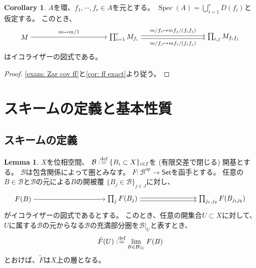 \documentclass[uplatex]{jsarticle}
\theoremstyle{definition}
\newtheorem{cor}[cor]{Corollary}
\newtheorem{lem}[lem]{Lemma}
\DeclareMathOperator{\Spec}{\mathrm{Spec}}
\newcommand{\op}{\mathrm{op}}
\newcommand{\dfn}{:\overset{\mbox{{\scriptsize def}}}{=}}
\newcommand{\mcB}{\mathcal{B}}
\begin{document}
\begin{cor}\label{cor: Zar cov exact}
  \(A\)を環、\(f_1,\cdots, f_r\in A\)を元とする。
  \(\Spec(A) = \bigcup_{i=1}^rD(f_i)\)と仮定する。
  このとき、
  \[
  \begin{tikzpicture}[auto]
    \node (a) at (0, 0) {\(M\)};
    \node (b) at (5, 0) {\(\prod_{i=1}^r M_{f_i}\)};
    \node (c) at (10, 0) {\(\prod_{i,j} M_{f_if_j}\)};
    \draw[->] (a) to node {\(\scriptstyle m\mapsto m/1\)} (b);
    \draw[->, transform canvas={yshift=2pt}]
    (b) to node {\(\scriptstyle m/f_i\mapsto mf_j/(f_if_j)\)} (c);
    \draw[->, transform canvas={yshift=-2pt}]
    (b) to node[swap] {\(\scriptstyle m/f_j\mapsto mf_i/(f_if_j)\)} (c);
  \end{tikzpicture}
  \]
  はイコライザーの図式である。
\end{cor}

\begin{proof}
  \autoref{exam: Zar cov ff}と\autoref{cor: ff exact}より従う。
\end{proof}




\section{スキームの定義と基本性質}



\subsection{スキームの定義}


\begin{lem}\label{lem: B-sh}
  \(X\)を位相空間、
  \(\mcB \dfn \{B_i\subset X\}_{i\in I}\)を (有限交差で閉じる) 開基とする。
  \(\mcB\)は包含関係によって圏とみなす。
  \(F:\mcB^{\op} \to \mathsf{Set}\)を函手とする。
  任意の\(B\in \mcB\)と\(\mcB\)の元による\(B\)の開被覆
  \(\{B_j\in \mcB\}_{j\in J}\)に対し、
  \[
  \begin{tikzpicture}[auto]
    \node (a) at (0, 0) {\(F(B)\)};
    \node (b) at (5, 0) {\(\prod_j F(B_j)\)};
    \node (c) at (10, 0) {\(\prod_{j_1,j_2} F(B_{j_1j_2})\)};
    \draw[->] (a) to (b);
    \draw[->, transform canvas={yshift=2pt}]
    (b) to (c);
    \draw[->, transform canvas={yshift=-2pt}]
    (b) to (c);
  \end{tikzpicture}
  \]
  がイコライザーの図式であるとする。
  このとき、任意の開集合\(U\subset X\)に対して、
  \(U\)に属する\(\mcB\)の元からなる\(\mcB\)の充満部分圏を\(\mcB|_U\)と表すとき、
  \[
  \tilde{F}(U) \dfn \lim_{B\in \mcB|_U}F(B)
  \]
  とおけば、\(\tilde{F}\)は\(X\)上の層となる。
\end{lem}
\end{document}
